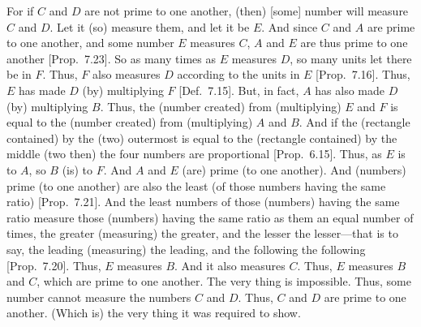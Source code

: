 \begin{Parallel}{}{}
{For if $C$ and $D$ are not prime to one another, (then) [some] number will
measure $C$ and $D$. Let it (so) measure them, and let it be $E$. And since
$C$ and $A$ are prime to one another, and some number $E$ measures $C$, $A$ and $E$
are thus prime to one another  [Prop.~7.23].
So as many times as $E$ measures $D$, so many units let there be in $F$.
Thus, $F$ also measures $D$ according to the units in $E$ [Prop.~7.16]. Thus, $E$ has made $D$ (by) multiplying
$F$ [Def.~7.15]. But, in fact, $A$ has also made
$D$ (by) multiplying $B$.
 Thus, the (number created) from (multiplying) $E$ and $F$ is equal to the  (number created) from (multiplying) $A$ and $B$. And if the (rectangle contained) by the (two)
outermost is equal to the (rectangle contained) by the middle (two then) the
four numbers are proportional [Prop.~6.15].
Thus, as $E$ is to $A$, so $B$  (is) to $F$. And $A$ and $E$ (are) prime (to one another).
And (numbers) prime (to one another) are also the least (of those numbers having the same ratio)
[Prop.~7.21]. And the least numbers of those
(numbers) having the same ratio  measure those (numbers)
having the same ratio as them an equal number of times,
the greater (measuring) the greater, and the lesser the lesser---that is
to say, the leading (measuring) the leading, and the following the
following [Prop.~7.20]. Thus, $E$
measures $B$.  And it also measures $C$. Thus, $E$ measures $B$ and $C$, which
are prime to one another. The very thing is impossible. Thus, some
number cannot measure the numbers $C$ and $D$. Thus, $C$ and
$D$ are prime to one another. (Which is) the very thing it was required
to show.}
\end{Parallel}

